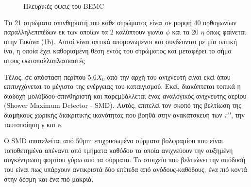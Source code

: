 	\begin{figure}[h!]
    \centering
    \qquad
    \caption{Πλευρικές όψεις του ΒΕΜC}
    \label{fig3.12}%
\end{figure}

	Τα 21 στρώματα σπινθηριστή του κάθε στρώματος είναι σε μορφή 40 ορθογωνίων παραλληλεπιπέδων εκ των οποίων τα 2 καλύπτουν γωνία $\phi$ και τα 20 $\eta$ όπως φαίνεται στην Εικόνα (\ref{fig3.12}b). Αυτοί είναι οπτικά απομονωμένοι και συνδέονται με μία οπτική ίνα, η οποία έχει καθορισμένη θέση εντός του στρώματος και μεταφέρει το σήμα στους φωτοπολλαπλασιαστές
	
	Τέλος, σε απόσταση περίπου 5.6$X_0$ από την αρχή του ανιχνευτή είναι εκεί όπου επιτυγχάνεται το μέγιστο της ενέργειας του καταιγισμού. Εκεί, διακόπτεται τοπικά η διαδοχή μολύβδού-σπινθηριστή και παρεμβάλλεται ένας αναλογικός ανιχνευτής αερίου (Shower Maximum Detector - SMD).
	Αυτός, επιτελεί τον σκοπό της βελτίωση της διαμήκους χωρικής διακριτικής ικανότητας που βοηθά στην ανακατσκευή των $\pi^0$, την ταυτοποίηση γ και e.
	
	O SMD αποτελείται από 50μm επιχρυσωμένα σύρματα βολφραμίου που είναι τοποθετημένα απέναντι από τμήματα καθόδου τα οποία ανιχνεύουν την αυξημένη συγκέντρωση φορτίου γύρω από τα σύρματα. To στοιχείο που βελτιώνει την απόδοσή του είναι πως υπάρχουν αντικριστά δύο επίπεδα από ανόδους-καθόδους, ένα πιό κοντά στην δέσμη και ένα πιό μακριά.
	